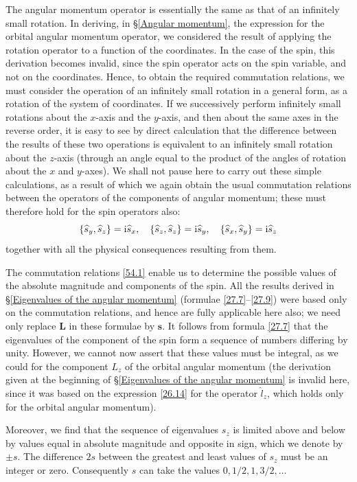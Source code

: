 The angular momentum operator is essentially the same as that of an infinitely small rotation. In deriving, in \S\ref{Angular momentum}, the expression for the orbital angular momentum operator, we considered the result of applying the rotation operator to a function of the coordinates. In the case of the spin, this derivation becomes invalid, since the spin operator acts on the spin variable, and not on the coordinates. Hence, to obtain the required commutation relations, we must consider the operation of an infinitely small rotation in a general form, as a rotation of the system of coordinates. If we successively perform infinitely small rotations about the $ x $-axis and the $ y $-axis, and then about the same axes in the reverse order, it is easy to see by direct calculation that the difference between the results of these two operations is equivalent to an infinitely small rotation about the $ z $-axis (through an angle equal to the product of the angles of rotation about the $ x $ and $ y $-axes). We shall not pause here to carry out these simple calculations, as a result of which we again obtain the usual commutation relations between the operators of the components of angular momentum; these must therefore hold for the spin operators also:
\begin{equation}\label{54.1}
\{\widehat{s}_y,\widehat{s}_z\}=\mathrm{i}\widehat{s}_x,\quad\{\widehat{s}_z,\widehat{s}_z\}=\mathrm{i}\widehat{s}_y,\quad\{\widehat{s}_x,\widehat{s}_y\}=\mathrm{i}\widehat{s}_z
\end{equation}
together with all the physical consequences resulting from them.

The commutation relations \eqref{54.1} enable us to determine the possible values of the absolute magnitude and components of the spin. All the results derived in \S\ref{Eigenvalues of the angular momentum} (formulae \eqref{27.7}–\eqref{27.9}) were based only on the commutation relations, and hence are fully applicable here also; we need only replace $ \bm{L} $ in these formulae by $ \bm{s} $. It follows from formula \eqref{27.7} that the eigenvalues of the component of the spin form a sequence of numbers differing by unity. However, we cannot now assert that these values must be integral, as we could for the component $ L_z $ of the orbital angular momentum (the derivation given at the beginning of \S\ref{Eigenvalues of the angular momentum} is invalid here, since it was based on the expression \eqref{26.14} for the operator $\hat{l}_z$, which holds only for the orbital angular momentum).

Moreover, we find that the sequence of eigenvalues $ s_z $ is limited above and below by values equal in absolute magnitude and opposite in sign, which we denote by $ \pm s $. The difference $ 2s $ between the greatest and least values of $ s_z $ must be an integer or zero. Consequently $ s $ can take the values $ 0, 1/2, 1, 3/2,\dots $

